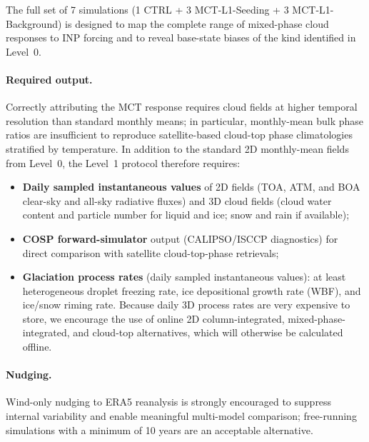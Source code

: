 The full set of 7 simulations (1 CTRL + 3 MCT-L1-Seeding +
3 MCT-L1-Background) is designed to map the complete range of
mixed-phase cloud responses to INP forcing and to reveal base-state biases of
the kind identified in Level~0.

\paragraph{Required output.}
Correctly attributing the MCT response requires cloud fields at higher
temporal resolution than standard monthly means; in particular, monthly-mean
bulk phase ratios are insufficient to reproduce satellite-based cloud-top
phase climatologies stratified by temperature.
In addition to the standard 2D monthly-mean fields from Level~0, the Level~1
protocol therefore requires:
\begin{itemize}
  \item \textbf{Daily sampled instantaneous values} of 2D fields (TOA, ATM,
        and BOA clear-sky and all-sky radiative fluxes) and 3D cloud fields
        (cloud water content and particle number for liquid and ice; snow and
        rain if available);
  \item \textbf{COSP forward-simulator} output (CALIPSO/ISCCP diagnostics)
        for direct comparison with satellite cloud-top-phase retrievals;
  \item \textbf{Glaciation process rates} (daily sampled instantaneous values):
        at least heterogeneous droplet freezing rate, ice depositional growth
        rate (WBF), and ice/snow riming rate.
        Because daily 3D process rates are very expensive to store, we encourage
        the use of online 2D column-integrated, mixed-phase-integrated, and
        cloud-top alternatives, which will otherwise be calculated offline.
\end{itemize}

\paragraph{Nudging.}
Wind-only nudging to ERA5 reanalysis is strongly encouraged to suppress
internal variability and enable meaningful multi-model comparison; free-running
simulations with a minimum of 10 years are an acceptable alternative.
